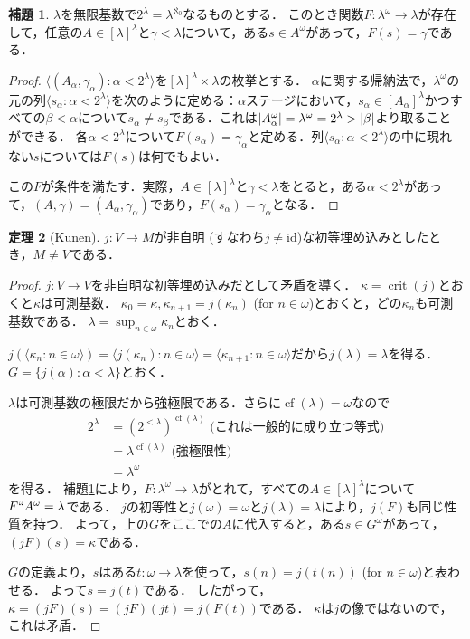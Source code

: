 \documentclass[uplatex]{jsarticle}
\newcommand{\id}{\mathrm{id}}
\newcommand{\cf}{\operatorname{cf}}
\newcommand{\crit}{\operatorname{crit}}
\newcommand{\seq}[1]{{\langle#1\rangle}}
\DeclarePairedDelimiter\abs{\lvert}{\rvert}
\theoremstyle{definition}
\newtheorem{thm}{定理}[section]
\newtheorem{lem}[thm]{補題}
\begin{document}
	\begin{lem}\label{lem:kunenslemma}
		$\lambda$を無限基数で$2^\lambda = \lambda^{\aleph_0}$なるものとする．
		このとき関数$F \colon \lambda^\omega \to \lambda$が存在して，任意の$A \in [\lambda]^\lambda$と$\gamma < \lambda$について，ある$s \in A^\omega$があって，$F(s) = \gamma$である．
	\end{lem}
	\begin{proof}
		$\seq{(A_\alpha, \gamma_\alpha) : \alpha < 2^\lambda}$を$[\lambda]^\lambda \times \lambda$の枚挙とする．
		$\alpha$に関する帰納法で，$\lambda^\omega$の元の列$\seq{s_\alpha : \alpha < 2^\lambda}$を次のように定める：$\alpha$ステージにおいて，$s_\alpha \in [A_\alpha]^\lambda$かつすべての$\beta < \alpha$について$s_\alpha \ne s_\beta$である．これは$\abs{A_\alpha^\omega} = \lambda^\omega = 2^\lambda > \abs{\beta}$より取ることができる．
		各$\alpha < 2^\lambda$について$F(s_\alpha) = \gamma_\alpha$と定める．列$\seq{s_\alpha : \alpha < 2^\lambda}$の中に現れない$s$については$F(s)$は何でもよい．
		
		この$F$が条件を満たす．実際，$A \in [\lambda]^\lambda$と$\gamma < \lambda$をとると，ある$\alpha < 2^\lambda$があって，$(A, \gamma) = (A_\alpha, \gamma_\alpha)$であり，$F(s_\alpha) = \gamma_\alpha$となる．
	\end{proof}

	\begin{thm}[Kunen]
		$j \colon V \to M$が非自明 (すなわち$j \ne \id$)な初等埋め込みとしたとき，$M \ne V$である．
	\end{thm}
	\begin{proof}
		$j \colon V \to V$を非自明な初等埋め込みだとして矛盾を導く．
		$\kappa = \crit(j)$とおくと$\kappa$は可測基数．
		$\kappa_0 = \kappa, \kappa_{n+1} = j(\kappa_n)$ (for $n \in \omega$)とおくと，どの$\kappa_n$も可測基数である．
		$\lambda = \sup_{n \in \omega} \kappa_n$とおく．
		
		$j(\seq{\kappa_n : n \in \omega}) = \seq{j(\kappa_n) : n \in \omega} = \seq{\kappa_{n+1} : n \in \omega}$だから$j(\lambda) = \lambda$を得る．
		$G = \{ j(\alpha) : \alpha < \lambda \}$とおく．
		
		$\lambda$は可測基数の極限だから強極限である．さらに$\cf(\lambda) = \omega$なので
		\begin{align*}
			2^\lambda &= (2^{<\lambda})^{\cf(\lambda)} \text{ (これは一般的に成り立つ等式)} \\
			&= \lambda^{\cf(\lambda)} \text{ (強極限性)} \\
			&= \lambda^\omega		
		\end{align*}
		を得る．
		補題\ref{lem:kunenslemma}により，$F \colon \lambda^\omega \to \lambda$がとれて，すべての$A \in [\lambda]^\lambda$について$F``A^\omega = \lambda$である．
		$j$の初等性と$j(\omega) = \omega$と$j(\lambda) = \lambda$により，$j(F)$も同じ性質を持つ．
		よって，上の$G$をここでの$A$に代入すると，ある$s \in G^\omega$があって， $(jF)(s) = \kappa$である．
		
		$G$の定義より，$s$はある$t \colon \omega \to \lambda$を使って，$s(n) = j(t(n))$ (for $n\in\omega$)と表わせる．
		よって$s = j(t)$である．
		したがって，$\kappa = (jF)(s) = (jF)(jt) = j(F(t))$である．
		$\kappa$は$j$の像ではないので，これは矛盾．
	\end{proof}
\end{document}
